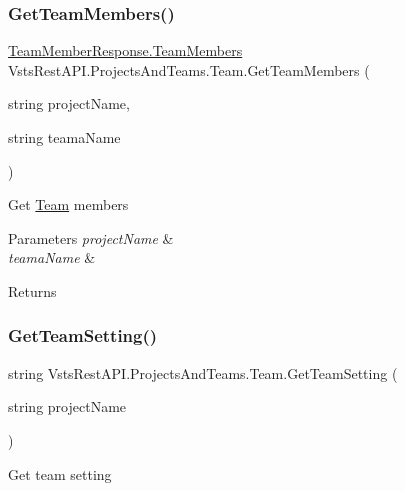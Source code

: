 \subsubsection{\texorpdfstring{Get\+Team\+Members()}{GetTeamMembers()}}
{\footnotesize\ttfamily \mbox{\hyperlink{class_vsts_rest_a_p_i_1_1_viewmodel_1_1_project_and_teams_1_1_team_member_response_1_1_team_members}{Team\+Member\+Response.\+Team\+Members}} Vsts\+Rest\+A\+P\+I.\+Projects\+And\+Teams.\+Team.\+Get\+Team\+Members (\begin{DoxyParamCaption}\item[{string}]{project\+Name,  }\item[{string}]{teama\+Name }\end{DoxyParamCaption})}



Get \mbox{\hyperlink{class_vsts_rest_a_p_i_1_1_projects_and_teams_1_1_team}{Team}} members 


\begin{DoxyParams}{Parameters}
{\em project\+Name} & \\
\hline
{\em teama\+Name} & \\
\hline
\end{DoxyParams}
\begin{DoxyReturn}{Returns}

\end{DoxyReturn}
\mbox{\label{class_vsts_rest_a_p_i_1_1_projects_and_teams_1_1_team_af1ece216c9baa58c5e8b2a527318ba3c}} 
\subsubsection{\texorpdfstring{Get\+Team\+Setting()}{GetTeamSetting()}}
{\footnotesize\ttfamily string Vsts\+Rest\+A\+P\+I.\+Projects\+And\+Teams.\+Team.\+Get\+Team\+Setting (\begin{DoxyParamCaption}\item[{string}]{project\+Name }\end{DoxyParamCaption})}



Get team setting 


